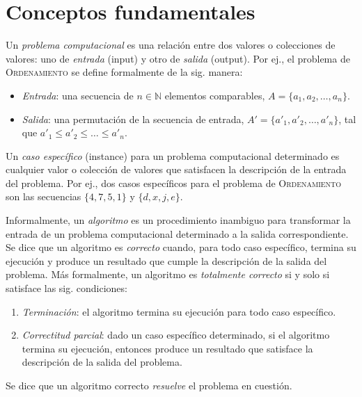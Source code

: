 \chapter{Conceptos fundamentales}

Un \emph{problema computacional} es una relación entre dos valores o colecciones de valores: uno de \emph{entrada} (input) y otro de \emph{salida} (output). Por ej., el problema de \textsc{Ordenamiento} se define formalmente de la sig. manera:
\begin{itemize}
  \item \emph{Entrada}: una secuencia de \(n\in\mathbb{N}\) elementos comparables, \(A=\{a_1,a_2,\dots,a_n\}\).
  \item \emph{Salida}: una permutación de la secuencia de entrada, \(A'=\{a'_1,a'_2,\dots,a'_n\}\), tal que \(a'_1\leq a'_2\leq\dots\leq a'_n\).
\end{itemize}

Un \emph{caso específico} (instance) para un problema computacional determinado es cualquier valor o colección de valores que satisfacen la descripción de la entrada del problema. 
Por ej., dos casos específicos para el problema de \textsc{Ordenamiento} son las secuencias \(\{4,7,5,1\}\) y \(\{d,x,j,e\}\).

Informalmente, un \emph{algoritmo} es un procedimiento inambiguo para transformar la entrada de un problema computacional determinado a la salida correspondiente.
Se dice que un algoritmo es \emph{correcto} cuando, para todo caso específico, termina su ejecución y produce un resultado que cumple la descripción de la salida del problema.
Más formalmente, un algoritmo es \emph{totalmente correcto} si y solo si satisface las sig. condiciones: 
\begin{enumerate}
  \item \emph{Terminación}: el algoritmo termina su ejecución para todo caso específico.
  \item \emph{Correctitud parcial}: dado un caso específico determinado, si el algoritmo termina su ejecución, entonces produce un resultado que satisface la descripción de la salida del problema.
\end{enumerate}
Se dice que un algoritmo correcto \emph{resuelve} el problema en cuestión.

